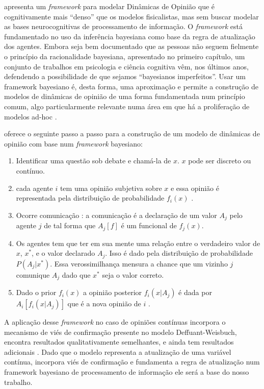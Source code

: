  apresenta um \textit{framework} para modelar
Dinâmicas de Opinião que é cognitivamente mais
``denso'' que os modelos fisicalistas, mas sem buscar modelar as bases
neurocognitivas de processamento de informação. O \textit{framework} está
fundamentado no uso da inferência bayesiana como base da regra de atualização
dos agentes. Embora seja bem documentado que as pessoas não seguem fielmente o
princípio da racionalidade bayesiana, apresentado no primeiro capítulo, um
conjunto de trabalhos em psicologia e ciência cognitiva vêm, nos últimos anos,
defendendo a possibilidade de que sejamos ``bayesianos
imperfeitos''\cite{griffiths2006optimal,fujikawa2007perfect,baker2017rational,
  gintis2016individuality}. Usar um framework bayesiano é, desta forma, uma
aproximação e permite a construção de modelos de dinâmicas de opinião de uma
forma fundamentada num princípio comum, algo particularmente relevante numa área
em que há a proliferação de modelos ad-hoc \cite{flache2017,jager2017}.

  oferece o seguinte passo a passo
para a construção de um modelo de dinâmicas de opinião com base num
\textit{framework} bayesiano:

\begin{enumerate}
\item Identificar uma questão sob debate e chamá-la de $x$. \(x\) pode ser
  discreto ou contínuo.
\item cada agente \(i\) tem uma opinião subjetiva sobre $x$ e essa opinião é
  representada pela distribuição de probabilidade $f_i(x)$ .
\item Ocorre comunicação : a comunicação é a declaração de um valor
  $ A_j$ pelo agente $j$ de tal forma que $A_j[f]$ é um funcional de
  $f_j(x)$.
\item Os agentes tem que ter em sua mente  uma relação entre o
  verdadeiro valor de \(x\),  \(x^*\),   e o valor declarado $A_j$. Isso é dado
  pela distribuição de probabilidade $P(A_j|x^*)$. Essa verossimilhança  mensura
  a chance que um vizinho \(j\) comunique \(A_j\) dado que \(x^*\) seja o valor correto.
\item Dado o prior $f_i(x)$ a opinião posterior $f_i(x|A_j)$ é dada
  por $A_i[f_i(x|A_j)]$ que é a nova opinião de $i$ .
\end{enumerate}





A aplicação desse \textit{framework} no caso de opiniões contínuas incorpora o
mecanismo de viés de confirmação presente no modelo Deffuant-Weisbuch, encontra
resultados qualitativamente semelhantes, e ainda tem resultados adicionais
\cite{martins2009bayesian}. Dado que o modelo representa a atualização de uma
variável contínua, incorpora viés de confirmação e fundamenta a regra de
atualização num framework bayesiano de processamento de informação ele será a
base do nosso trabalho.

